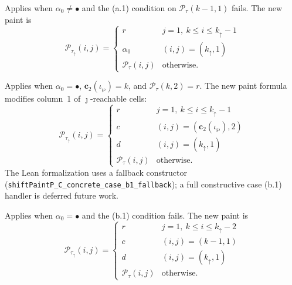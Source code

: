 \smallskip

\begin{definition}
  \label{def:shapeShiftC_case_a2}
  \leanok
  Applies when $\alpha_0 \neq \bullet$ and the (a.1) condition on $\mathcal{P}_\tau(k - 1, 1)$ fails.
  The new paint is
  \[
    \mathcal{P}_{\tau_\uparrow}(i, j) =
    \begin{cases}
      r & j = 1,\ k \leq i \leq k_\uparrow - 1 \\
      \alpha_0 & (i, j) = (k_\uparrow, 1) \\
      \mathcal{P}_\tau(i, j) & \text{otherwise.}
    \end{cases}
  \]
  \end{definition}

\smallskip

\begin{definition}
  \label{def:shapeShiftC_case_b1}
  \leanok
  Applies when $\alpha_0 = \bullet$, $\mathbf{c}_2(\iota_\wp) = k$, and $\mathcal{P}_\tau(k, 2) = r$.
  The new paint formula modifies column~1 of $\jmath$-reachable cells:
  \[
    \mathcal{P}_{\tau_\uparrow}(i, j) =
    \begin{cases}
      r & j = 1,\ k \leq i \leq k_\uparrow - 1 \\
      c & (i, j) = (\mathbf{c}_2(\iota_\wp), 2) \\
      d & (i, j) = (k_\uparrow, 1) \\
      \mathcal{P}_\tau(i, j) & \text{otherwise.}
    \end{cases}
  \]
  The Lean formalization uses a fallback constructor
  (\texttt{shiftPaintP\_C\_concrete\_case\_b1\_fallback}); a full constructive
  case (b.1) handler is deferred future work.
\end{definition}

\smallskip

\begin{definition}
  \label{def:shapeShiftC_case_b2}
  \leanok
  Applies when $\alpha_0 = \bullet$ and the (b.1) condition fails.
  The new paint is
  \[
    \mathcal{P}_{\tau_\uparrow}(i, j) =
    \begin{cases}
      r & j = 1,\ k \leq i \leq k_\uparrow - 2 \\
      c & (i, j) = (k - 1, 1) \\
      d & (i, j) = (k_\uparrow, 1) \\
      \mathcal{P}_\tau(i, j) & \text{otherwise.}
    \end{cases}
  \]
  \end{definition}

